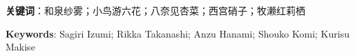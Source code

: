 \documentclass[\main/main.tex]{subfiles}
\begin{document}

\zhlipsum[1-2]

\noindent\textbf{关键词}：和泉纱雾；小鸟游六花；八奈见杏菜；西宫硝子；牧濑红莉栖

\blankpage


\lipsum[1-2]

\noindent\textbf{Keywords}: Sagiri Izumi; Rikka Takanashi; Anzu Hanami; Shouko Komi; Kurisu Makise


\blankpage
\end{document}
